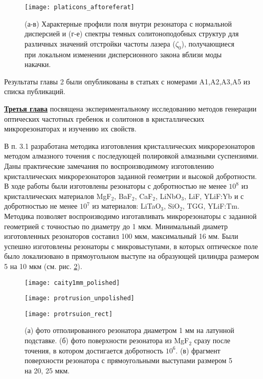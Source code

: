 \begin{figure}[!htb]
  \centering
  \texttt{[image: platicons\_aftoreferat]}
  \caption{(а-в) Характерные профили поля внутри резонатора с нормальной дисперсией и (г-е) спектры темных солитоноподобных структур для различных значений отстройки частоты лазера ($\zeta_0$), получающиеся при локальном изменении дисперсионного закона вблизи моды накачки.}
  \label{platicons}
\end{figure}

Результаты главы 2 были опубликованы в статьях с номерами A1,A2,A3,A5 из списка публикаций.

\underline{\textbf{Третья глава}} посвящена экспериментальному исследованию методов генерации оптических частотных гребенок и солитонов в кристаллических микрорезонаторах и изучению их свойств.

В п. 3.1 разработана методика изготовления кристаллических микрорезонаторов методом алмазного точения с последующей полировкой алмазными суспензиями. Даны практические замечания по воспроизводимому изготовлению кристаллических микрорезонаторов заданной геометрии и высокой добротности. В ходе работы были изготовлены резонаторы с добротностью не менее $10^8$ из кристаллических материалов MgF$_2$, BaF$_2$, CaF$_2$, LiNbO$_3$, LiF, YLiF:Yb и с добротностью не менее $10^7$ из материалов: LiTaO$_3$, SiO$_2$, TGG, YLiF:Tm. Методика позволяет воспроизводимо изготавливать микрорезонаторы с заданной геометрией с точностью по диаметру до 1 мкм. Минимальный диаметр изготовленных резонаторов составил 100 мкм, максимальный 16 мм. Были успешно изготовлены резонаторы с микровыступами, в которых оптическое поле было локализовано в прямоугольном выступе на образующей цилиндра размером 5 на 10 мкм (см. рис. \ref{cavity_polished}).

\begin{figure}[!htb]
  \begin{minipage}{0.32\linewidth}\centering
    \texttt{[image: caity1mm\_polished]}
  \end{minipage}
  \hfill
  \begin{minipage}{0.32\linewidth}\centering
    \texttt{[image: protrusion\_unpolished]}
  \end{minipage}
  \hfill
  \begin{minipage}{0.32\linewidth}\centering
    \texttt{[image: protrsuion\_rect]}
  \end{minipage}
  \caption{(а) фото отполированного резонатора диаметром 1 мм на латунной подставке. (б) фото поверхности резонатора из MgF$_2$ сразу после точения, в котором достигается добротность $10^6$. (в) фрагмент поверхности резонатора с прямоугольными выступами размером 5 на 20, 25 мкм.}
  \label{cavity_polished}
\end{figure}

